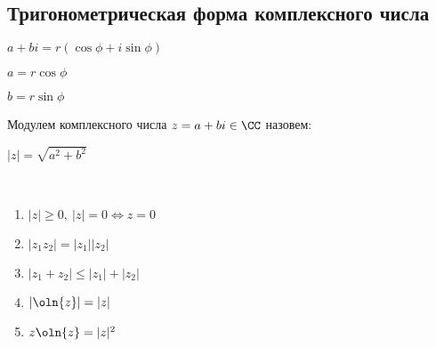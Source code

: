 \subsection{Тригонометрическая форма комплексного числа}

\begin{defn}
    
    $a + bi = r(\cos\phi + i\sin\phi)$
    
    $a = r\cos\phi$
    
    $b = r\sin\phi$
\end{defn}

\begin{defn}
    Модулем комплексного числа $z = a + bi \in \CC$ назовем:
    
    $|z| = \sqrt{a^2 + b^2}$
\end{defn}

\begin{theorem-non}~
    \begin{enumerate}
        \item $|z| \geq 0,~|z| = 0 \iff z = 0$
        
        \item $|z_1 z_2| = |z_1||z_2|$
        
        \item $|z_1 + z_2| \leq |z_1| + |z_2|$
        
        \item $|\oln{z}| = |z|$
        
        \item $z \oln{z} = |z|^2$
    \end{enumerate}
\end{theorem-non}

